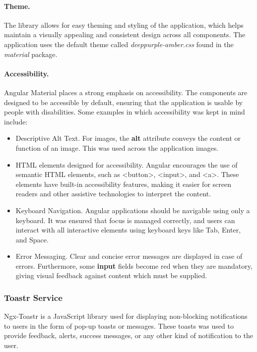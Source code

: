 \documentclass[multi, tikz, a4paper, oneside]{article}
\begin{document}
\paragraph{Theme.}
The library allows for easy theming and styling of the application, which helps
maintain a visually appealing and consistent design across all components. The
application uses the default theme called {\em{deeppurple-amber.css}} found in
the {\em{material}} package.

\paragraph{Accessibility.}
Angular Material places a strong emphasis on accessibility. The components are
designed to be accessible by default, ensuring that the application is usable by
people with disabilities. Some examples in which accessibility was kept in mind
include:

\begin{itemize}
\item Descriptive Alt Text. For images, the \textbf{alt} attribute conveys the
  content or function of an image. This was used across the application images.
\item HTML elements designed for accessibility. Angular encourages the use of
  semantic HTML elements, such as <button>, <input>, and <a>. These elements
  have built-in accessibility features, making it easier for screen readers and
  other assistive technologies to interpret the content.
\item Keyboard Navigation. Angular applications should be navigable using only a
  keyboard. It was ensured that focus is managed correctly, and users can
  interact with all interactive elements using keyboard keys like Tab, Enter,
  and Space.
\item Error Messaging. Clear and concise error messages are displayed in case of
  errors. Furthermore, some \textbf{input} fields become red when they are
  mandatory, giving visual feedback against content which must be supplied.
\end{itemize}

\subsubsection{Toastr Service}
Ngx-Toastr is a JavaScript library used for displaying non-blocking
notifications to users in the form of pop-up toasts or messages. These toasts
was used to provide feedback, alerts, success messages, or any other kind of
notification to the user.
\end{document}
